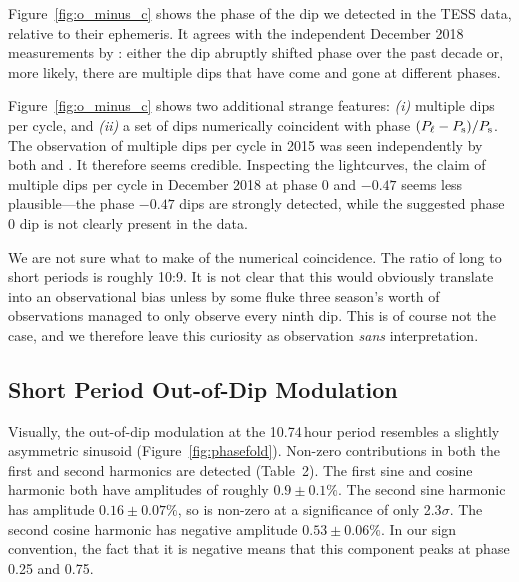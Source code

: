 \documentclass[12pt,twocolumn,tighten]{aastex62}
\begin{document}
Figure~\ref{fig:o_minus_c} shows the phase of the dip we detected
in the TESS data, relative to their ephemeris.  It agrees with the
independent December 2018 measurements by
\citet{tanimoto_evidence_2020}: either the dip abruptly shifted phase
over the past decade or, more likely, there are multiple dips that
have come and gone at different phases.

Figure~\ref{fig:o_minus_c} shows two additional strange features: {\it
(i)}  multiple dips per cycle, and {\it (ii)} a set of dips
numerically coincident with phase $(P_{\rm \ell} - P_{\rm s}) / P_{\rm
s}$.  The observation of multiple dips per cycle in 2015 was seen
independently by both \citet{yu_tests_2015} and
\citet{tanimoto_evidence_2020}.  It therefore seems credible.
Inspecting the \citet{tanimoto_evidence_2020} lightcurves, the claim
of multiple dips per cycle in December 2018 at phase 0 and $-0{.}47$
seems less plausible---the phase $-0{.}47$ dips are strongly detected,
while the suggested phase 0 dip is not clearly present in the data.

We are not sure what to make of the numerical coincidence.  The ratio
of long to short periods is roughly 10:9.  It is not clear that this
would obviously translate into an observational bias unless by some
fluke three season's worth of observations managed to only observe
every ninth dip.  This is of course not the case, and we therefore
leave this curiosity as observation {\it sans} interpretation.


\subsection{Short Period Out-of-Dip Modulation}

Visually, the out-of-dip modulation at the 10.74$\,$hour period
resembles a slightly asymmetric sinusoid (Figure~\ref{fig:phasefold}).
Non-zero contributions in both the first and second harmonics are
detected (Table~2).  The first sine and cosine harmonic both have
amplitudes of roughly $0.9\pm0.1\%$.  The second sine harmonic has
amplitude $0.16 \pm 0.07\%$, so is non-zero at a significance of only
2.3$\sigma$.  The second cosine harmonic has negative amplitude $0.53
\pm 0.06\%$.  In our sign convention, the fact that it is negative
means that this component peaks at phase 0.25 and 0.75.
\end{document}
